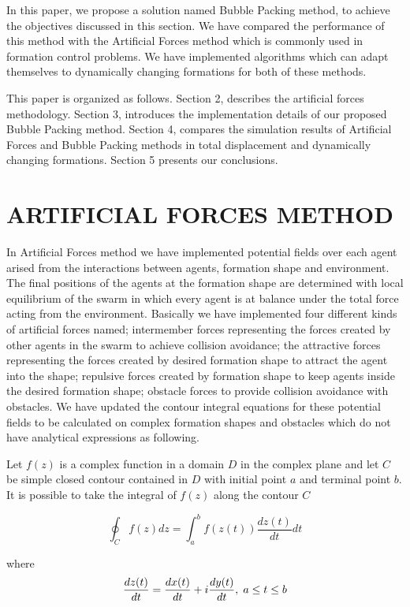 \documentclass[letterpaper, 10 pt, conference]{ieeeconf}  %
\begin{document}
In this paper, we propose a solution named Bubble Packing method, to achieve the objectives discussed in this section. We have compared the performance of this method with the Artificial Forces method which is commonly used in formation control problems. We have implemented algorithms which can adapt themselves to dynamically changing formations for both of these methods.

This paper is organized as follows. Section 2, describes the artificial forces methodology. Section 3, introduces the implementation details of our proposed Bubble Packing method. Section 4, compares the simulation results of Artificial Forces and Bubble Packing methods in total displacement and dynamically changing formations. Section 5 presents our conclusions.

\section{ARTIFICIAL FORCES METHOD}
In Artificial Forces method we have implemented potential fields over each agent arised from the interactions between agents, formation shape and environment. The final positions of the agents at the formation shape  are determined with local equilibrium of the swarm in which every agent is at balance under the total force acting from the environment. Basically we have implemented four different kinds of artificial forces named; intermember forces representing the forces created by other agents in the swarm to achieve collision avoidance; the attractive forces representing the forces created by desired formation shape to attract the agent into the shape; repulsive forces created by formation shape to keep agents inside the desired formation shape; obstacle forces to provide collision avoidance with obstacles. We have updated the contour integral equations for these potential fields \cite{17} to be calculated on complex formation shapes and obstacles which do not have analytical expressions as following.

Let $f(z)$ is a complex function in a domain $D$ in the complex plane and let $C$ be simple closed contour contained in $D$ with initial point $a$ and terminal point  $b$. It is possible to take the integral of $f(z)$ along the contour $C$ \cite{wiki_contour}
		
\begin{equation}
\oint_C f(z) dz = \int_{a}^{b} f(z(t))\frac{dz(t)}{dt} dt
\end{equation}		

where
\begin{equation}
\frac{dz(t)}{dt} = \frac{dx(t)}{dt} + i\frac{dy(t)}{dt},   \hspace{0.1cm} a\leq t\leq b
\end{equation}
		
\end{document}
